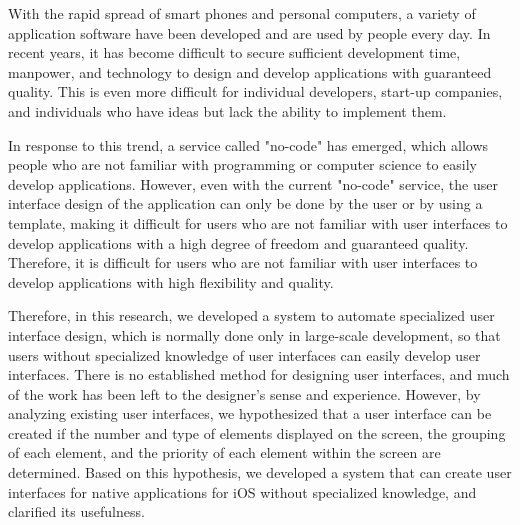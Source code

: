 \begin{eabstract}
With the rapid spread of smart phones and personal computers, a variety of application software have been developed and are used by people every day. In recent years, it has become difficult to secure sufficient development time, manpower, and technology to design and develop applications with guaranteed quality. This is even more difficult for individual developers, start-up companies, and individuals who have ideas but lack the ability to implement them.

In response to this trend, a service called "no-code" has emerged, which allows people who are not familiar with programming or computer science to easily develop applications. However, even with the current "no-code" service, the user interface design of the application can only be done by the user or by using a template, making it difficult for users who are not familiar with user interfaces to develop applications with a high degree of freedom and guaranteed quality. Therefore, it is difficult for users who are not familiar with user interfaces to develop applications with high flexibility and quality.

Therefore, in this research, we developed a system to automate specialized user interface design, which is normally done only in large-scale development, so that users without specialized knowledge of user interfaces can easily develop user interfaces. There is no established method for designing user interfaces, and much of the work has been left to the designer's sense and experience. However, by analyzing existing user interfaces, we hypothesized that a user interface can be created if the number and type of elements displayed on the screen, the grouping of each element, and the priority of each element within the screen are determined. Based on this hypothesis, we developed a system that can create user interfaces for native applications for iOS without specialized knowledge, and clarified its usefulness.

\end{eabstract}
